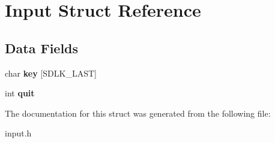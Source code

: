 \hypertarget{struct_input}{\section{Input Struct Reference}
\label{struct_input}
}
\subsection*{Data Fields}
\begin{DoxyCompactItemize}
\item 
\hypertarget{struct_input_afc4eabd057bd0061b56de4005f5ecbb8}{char {\bfseries key} \mbox{[}S\-D\-L\-K\-\_\-\-L\-A\-S\-T\mbox{]}}\label{struct_input_afc4eabd057bd0061b56de4005f5ecbb8}

\item 
\hypertarget{struct_input_a2896431d6a80cd39b3d24b40237612ee}{int {\bfseries quit}}\label{struct_input_a2896431d6a80cd39b3d24b40237612ee}

\end{DoxyCompactItemize}


The documentation for this struct was generated from the following file\-:\begin{DoxyCompactItemize}
\item 
input.\-h\end{DoxyCompactItemize}
